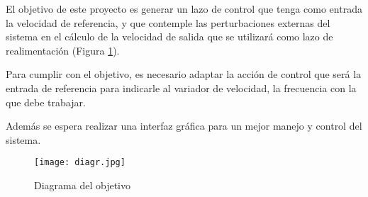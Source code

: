 El objetivo de este proyecto es generar un lazo de control que tenga como entrada la velocidad de referencia, y que contemple las perturbaciones externas del sistema en el cálculo de la velocidad de salida que se utilizará como lazo de realimentación (Figura \ref{fig:diagr}). 

Para cumplir con el objetivo, es necesario adaptar la acción de control que será la entrada de referencia para indicarle al variador de velocidad, la frecuencia con la que debe trabajar.

Además se espera realizar una interfaz gráfica para un mejor manejo y control del sistema.

\begin{figure}[htb]
	\centering
	\texttt{[image: diagr.jpg]}
	\caption{Diagrama del objetivo}
	\label{fig:diagr}
	\end{figure}


	\newpage